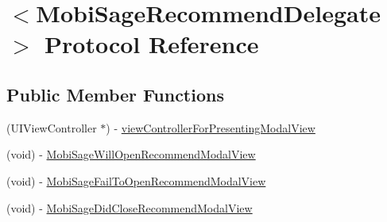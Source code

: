 \hypertarget{protocol_mobi_sage_recommend_delegate-p}{\section{$<$\-Mobi\-Sage\-Recommend\-Delegate$>$ \-Protocol \-Reference}
\label{protocol_mobi_sage_recommend_delegate-p}
}
\subsection*{\-Public \-Member \-Functions}
\begin{DoxyCompactItemize}
\item 
(\-U\-I\-View\-Controller $\ast$) -\/ \hyperlink{protocol_mobi_sage_recommend_delegate-p_afd6d11270cddf73bfa689ba40e11c0a9}{view\-Controller\-For\-Presenting\-Modal\-View}
\item 
(void) -\/ \hyperlink{protocol_mobi_sage_recommend_delegate-p_a9d5f142f78157406241914e2b9171d12}{\-Mobi\-Sage\-Will\-Open\-Recommend\-Modal\-View}
\item 
(void) -\/ \hyperlink{protocol_mobi_sage_recommend_delegate-p_ace60fdd1514713a93822409b89724cda}{\-Mobi\-Sage\-Fail\-To\-Open\-Recommend\-Modal\-View}
\item 
(void) -\/ \hyperlink{protocol_mobi_sage_recommend_delegate-p_adbd93d4fab3e6bce77035c4d80be1ee0}{\-Mobi\-Sage\-Did\-Close\-Recommend\-Modal\-View}
\end{DoxyCompactItemize}


